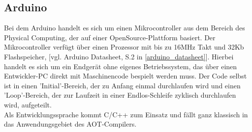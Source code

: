 \subsection{Arduino}
Bei dem Arduino handelt es sich um einen Mikrocontroller aus dem Bereich des Physical Computing, der auf einer OpenSource-Plattform basiert. Der Mikrocontroller verfügt über einen Prozessor mit bis zu 16MHz Takt und 32Kb Flashspeicher, [vgl. Arduino Datasheet, S.2 in \autoref{arduino_datasheet}]. Hierbei handelt es sich um ein Endgerät ohne eigenes Betriebssystem, das über einen Entwickler-PC direkt mit Maschinencode bespielt werden muss. Der Code selbst ist in einen 'Initial'-Bereich, der zu Anfang einmal durchlaufen wird und einen 'Loop'-Bereich, der zur Laufzeit in einer Endlos-Schleife zyklisch durchlaufen wird, aufgeteilt.\\
Als Entwicklungssprache kommt C/C++ zum Einsatz und fällt ganz klassisch in das Anwendungsgebiet des \ac{AOT}-Compilers.


